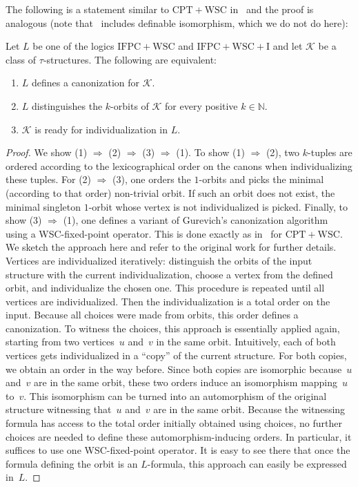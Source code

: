 \documentclass[]{lmcs}
\newcommand{\nat}{\mathbb{N}}
\newcommand{\GraphClass}{\mathcal{K}}
\newcommand{\sig}{\tau}
\newcommand{\CPTWSC}{\ensuremath{\mathrm{CPT{+}WSC}}}
\newcommand{\IFPCWSC}{\ensuremath{\mathrm{IFPC{+}WSC}}}
\newcommand{\IFPCWSCI}{\ensuremath{\mathrm{IFPC{+}WSC{+}I}}}
\begin{document}
The following is a statement similar to \CPTWSC{} in~\cite{LichterSchweitzer24}
and the proof is analogous (note that~\cite{LichterSchweitzer24} includes definable isomorphism, which we do not do here):
\begin{lem}
	\label{lem:canon-orbit-ready-iff}
	Let $L$ be one of the logics \IFPCWSC{} and \IFPCWSCI{} and
	let $\GraphClass$ be a class of $\sig$-structures.
	The following are equivalent:
	\begin{enumerate}
		\item $L$ defines a canonization for $\GraphClass$.
		\item $L$ distinguishes the $k$-orbits of $\GraphClass$ for every positive $k \in \nat$.
		\item $\GraphClass$ is ready for individualization in $L$.
	\end{enumerate}
\end{lem}
\begin{proof}
	We show (1) $\Rightarrow$ (2) $\Rightarrow$ (3) $\Rightarrow$ (1).
	To show (1) $\Rightarrow$ (2),
	two $k$-tuples are ordered
	according to the lexicographical order on the canons
	when individualizing these tuples.
	For (2) $\Rightarrow$ (3),
	one orders the $1$-orbits and picks the minimal (according to that order)
	non-trivial orbit.
	If such an orbit does not exist, the minimal
	singleton $1$-orbit whose vertex is not individualized is picked.
	Finally, to show (3) $\Rightarrow$ (1),
	one defines a variant of Gurevich's canonization algorithm~\cite{Gurevich97}
	using a WSC-fixed-point operator.
	This is done exactly as in~\cite{LichterSchweitzer24} for \CPTWSC{}.
	We sketch the approach here and refer to the original work for further details.
	Vertices are individualized iteratively: distinguish the orbits of the input structure with the current individualization, 
	choose a vertex from the defined orbit, and
	individualize the chosen one.
	This procedure is repeated until all vertices are individualized.
	Then the individualization is a total order on the input.
	Because all choices were made from orbits, this order defines a canonization.
	To witness the choices, this approach is essentially applied again,
	starting from two vertices~$u$ and~$v$ in the same orbit.
	Intuitively,  each of both vertices gets individualized in a ``copy''
	of the current structure.
	For both copies, we obtain an order in the way before.
	Since both copies are isomorphic because~$u$ and~$v$ are in the same orbit,
	these two orders induce an isomorphism mapping~$u$ to~$v$.
	This isomorphism can be turned into an  automorphism of the original structure
	witnessing that~$u$ and~$v$ are in the same orbit.
	Because the witnessing formula has access to the total order initially obtained using choices,
	no further choices are needed to define these automorphism-inducing orders.
	In particular, it suffices to use one WSC-fixed-point operator.
	It is easy to see there that once the formula defining the orbit is an $L$-formula,
	this approach can easily be expressed in~$L$.
\end{proof}
\end{document}
